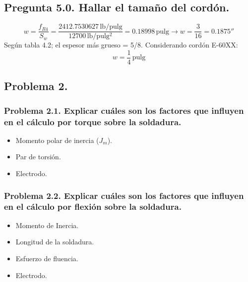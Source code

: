 \documentclass[a4paper,11pt]{article}
\newcommand{\mrm}{\mathrm}
\begin{document}
\subsection*{Pregunta 5.0. Hallar el tamaño del cordón.}
$$
w = \frac{f_{R4}}{S_{w}} = \frac{2412.7530627\,\mrm{lb/pulg}}{12700\,\mrm{lb/pulg^{2}}} = 0.18998\,\mrm{pulg} \longrightarrow w = \frac{3}{16} = 0.1875''
$$
Según tabla 4.2; el espesor más grueso = 5/8. Considerando cordón E-60XX:
$$
w = \frac{1}{4}\,\mrm{pulg}
$$
\subsection*{Problema 2.}
\subsubsection*{Problema 2.1. Explicar cuáles son los factores que influyen en el cálculo por torque sobre la soldadura.}
\begin{itemize}
    \item Momento polar de inercia ($J_{m}$).
    \item Par de torsión.
    \item Electrodo.
\end{itemize}
\subsubsection*{Problema 2.2. Explicar cuáles son los factores que influyen en el cálculo por flexión sobre la soldadura.}
\begin{itemize}
    \item Momento de Inercia.
    \item Longitud de la soldadura.
    \item Esfuerzo de fluencia.
    \item Electrodo.
\end{itemize}
\end{document}
